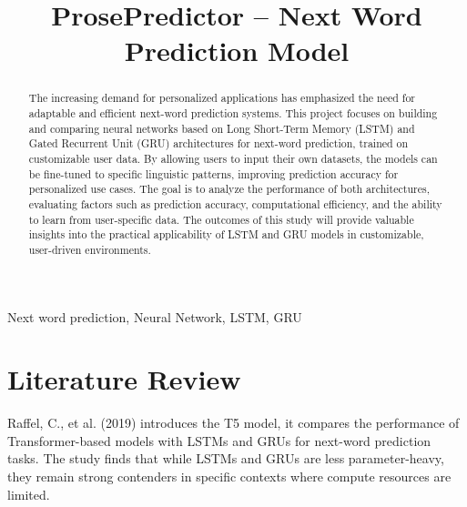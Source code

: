 \documentclass[conference]{IEEEtran}
\begin{document}
\title{ProsePredictor – Next Word Prediction Model\\}

\author{



\and
{}
} \maketitle

\begin{abstract} The increasing demand for personalized applications has emphasized the need for adaptable and efficient next-word prediction systems. This project focuses on building and comparing neural networks based on Long Short-Term Memory (LSTM) and Gated Recurrent Unit (GRU) architectures for next-word prediction, trained on customizable user data. By allowing users to input their own datasets, the models can be fine-tuned to specific linguistic patterns, improving prediction accuracy for personalized use cases. The goal is to analyze the performance of both architectures, evaluating factors such as prediction accuracy, computational efficiency, and the ability to learn from user-specific data. The outcomes of this study will provide valuable insights into the practical applicability of LSTM and GRU models in customizable, user-driven environments.
 \end{abstract}
 \begin{IEEEkeywords}Next word prediction, Neural Network, LSTM, GRU
 \end{IEEEkeywords}

\section*{Literature Review}Raffel, C., et al. (2019) introduces the T5 model, it compares the performance of Transformer-based models with LSTMs and GRUs for next-word prediction tasks. The study finds that while LSTMs and GRUs are less parameter-heavy, they remain strong contenders in specific contexts where compute resources are limited.
\end{document}
